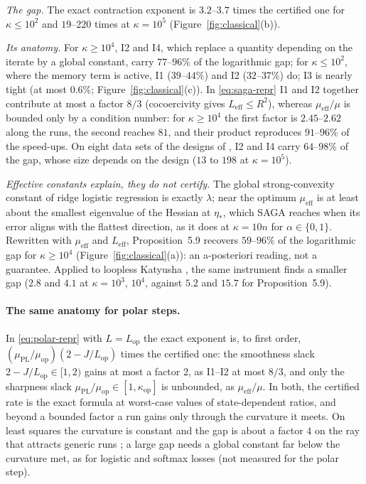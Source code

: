 \documentclass[10pt]{article}
\theoremstyle{remark}
\newcommand{\Lop}{L_{\mathrm{op}}}
\newcommand{\muop}{\mu_{\mathrm{op}}}
\newcommand{\kop}{\kappa_{\mathrm{op}}}
\newcommand{\etas}{\eta_\ast}
\newcommand{\muEff}{\mu_{\mathrm{eff}}}
\newcommand{\LEff}{L_{\mathrm{eff}}}
\newcommand{\muPL}{\mu_{\mathrm{PL}}}
\begin{document}
\begin{description}[leftmargin=2.3em,labelwidth=2.0em,labelsep=0.3em,itemsep=1pt,topsep=3pt,parsep=0pt,font=\normalfont\bfseries]
\item[(C1)] \emph{The gap.} The exact contraction exponent is $3.2$--$3.7$ times the certified one for $\kappa\le10^2$
and $19$--$220$ times at $\kappa=10^5$ (Figure~\ref{fig:classical}(b)).
\item[(C2)] \emph{Its anatomy.} For $\kappa\ge10^4$, I2 and I4, which replace a quantity depending on the iterate by a
global constant, carry $77$--$96\%$ of the logarithmic gap; for $\kappa\le10^2$, where the memory term is active, I1
($39$--$44\%$) and I2 ($32$--$37\%$) do; I3 is nearly tight (at most $0.6\%$; Figure~\ref{fig:classical}(c)). In
\eqref{eq:saga-repr} I1 and I2 together contribute at most a factor $8/3$ (cocoercivity gives $\LEff\le R^2$), whereas
$\muEff/\mu$ is bounded only by a condition number: for $\kappa\ge10^4$ the first factor is $2.45$--$2.62$ along the runs,
the second reaches $81$, and their product reproduces $91$--$96\%$ of the speed-ups. On eight data sets of the designs
of \cite{na2023hessian}, I2 and I4 carry $64$--$98\%$ of the gap, whose size depends on the design ($13$ to $198$ at
$\kappa=10^5$).
\item[(C3)] \emph{Effective constants explain, they do not certify.} The global strong-convexity constant of ridge
logistic regression is exactly $\lambda$; near the optimum $\muEff$ is at least about the smallest eigenvalue of the
Hessian at $\etas$, which SAGA reaches when its error aligns with the flattest direction, as it does at $\kappa=10n$ for
$\alpha\in\{0,1\}$. Rewritten with $\muEff$ and $\LEff$, Proposition~5.9 recovers $59$--$96\%$ of the logarithmic gap for
$\kappa\ge10^4$ (Figure~\ref{fig:classical}(a)): an a-posteriori reading, not a guarantee. Applied to loopless Katyusha
\cite{kovalev2020dont}, the same instrument finds a smaller gap ($2.8$ and $4.1$ at $\kappa=10^3$, $10^4$, against $5.2$
and $15.7$ for Proposition~5.9).
\end{description}

\paragraph{The same anatomy for polar steps.} In \eqref{eq:polar-repr} with $L=\Lop$ the exact exponent is, to first
order, $(\muPL/\muop)(2-J/\Lop)$ times the certified one: the smoothness slack $2-J/\Lop\in[1,2)$ gains at most a factor
$2$, as I1--I2 at most $8/3$, and only the sharpness slack $\muPL/\muop\in[1,\kop]$ is unbounded, as $\muEff/\mu$. In
both, the certified rate is the exact formula at worst-case values of state-dependent ratios, and beyond a bounded factor
a run gains only through the curvature it meets. On least squares the curvature is constant and the gap is about a
factor $4$ on the ray that attracts generic runs \cite{shulgin2026quadratic}; a large gap needs a global constant far
below the curvature met, as for logistic and softmax losses (not measured for the polar step).
\end{document}
